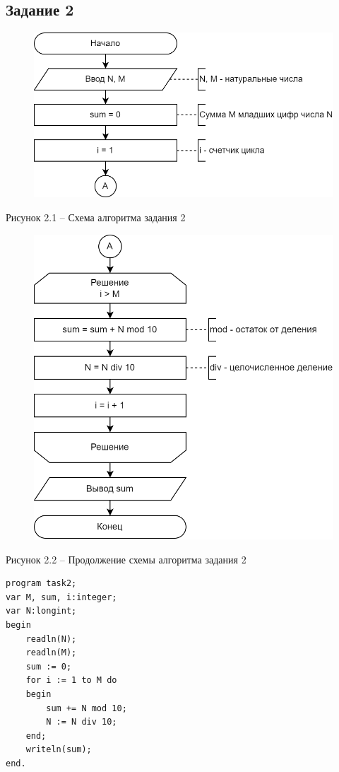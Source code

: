 \documentclass[a4paper,14pt]{extarticle}
\begin{document}
  \subsection*{Задание 2}
  \begin{figure}[h]
    \centering
    \includegraphics[width=0.6\linewidth]{schemes/t-2-1}
  \end{figure}
  \begin{center}
    Рисунок 2.1 – Схема алгоритма задания 2
  \end{center}

  \pagebreak
  \begin{figure}[h]
    \centering
    \includegraphics[width=0.6\linewidth]{schemes/t-2-2}
  \end{figure}
  \begin{center}
    Рисунок 2.2 – Продолжение схемы алгоритма задания 2
  \end{center}

  \begin{lstlisting}
program task2;
var M, sum, i:integer;
var N:longint;
begin
    readln(N);
    readln(M);
    sum := 0;
    for i := 1 to M do
    begin
        sum += N mod 10;
        N := N div 10;
    end;
    writeln(sum);
end.
  \end{lstlisting}

  \pagebreak
\end{document}
